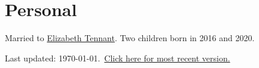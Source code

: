 \documentclass[letterpaper,11pt]{article}
\newcommand{\entryfull}[1]{\noindent #1\par\vspace{0.7em}}
\begin{document}
\section{Personal}
\entryfull{Married to \href{https://liztennant.github.io}{Elizabeth Tennant}. Two children born in 2016 and 2020.}

\vspace{1.5em}
\begin{center}\footnotesize\color{black!55}
Last updated: \monthyeardate\today.\ \href{https://www.mathtd.info/cv/cv.pdf}{Click here for most recent version.}
\end{center}
\end{document}
